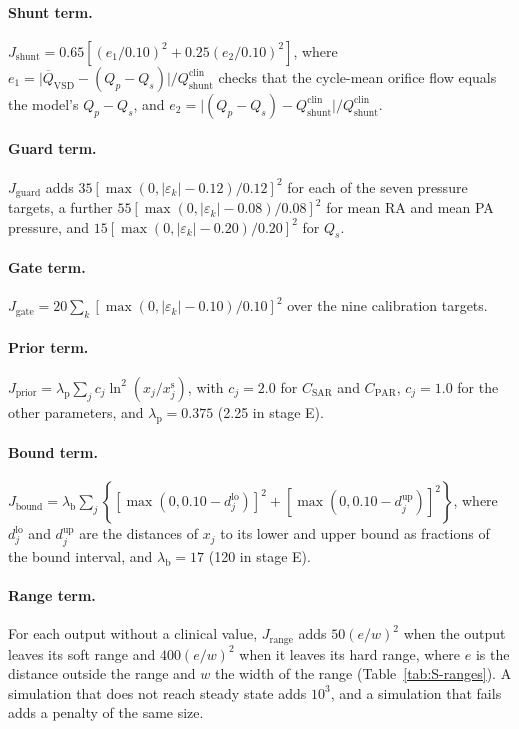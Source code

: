 \documentclass{article}
\begin{document}
\paragraph{Shunt term.} $J_{\mathrm{shunt}} = 0.65\left[(e_1/0.10)^2 + 0.25(e_2/0.10)^2\right]$, where $e_1 = \lvert \overline{Q}_{\mathrm{VSD}} - (Q_p - Q_s)\rvert / Q_{\mathrm{shunt}}^{\mathrm{clin}}$ checks that the cycle-mean orifice flow equals the model's $Q_p - Q_s$, and $e_2 = \lvert (Q_p - Q_s) - Q_{\mathrm{shunt}}^{\mathrm{clin}}\rvert / Q_{\mathrm{shunt}}^{\mathrm{clin}}$.

\paragraph{Guard term.} $J_{\mathrm{guard}}$ adds $35[\max(0, \lvert\varepsilon_k\rvert - 0.12)/0.12]^2$ for each of the seven pressure targets, a further $55[\max(0, \lvert\varepsilon_k\rvert - 0.08)/0.08]^2$ for mean RA and mean PA pressure, and $15[\max(0, \lvert\varepsilon_k\rvert - 0.20)/0.20]^2$ for $Q_s$.

\paragraph{Gate term.} $J_{\mathrm{gate}} = 20\sum_{k}[\max(0, \lvert\varepsilon_k\rvert - 0.10)/0.10]^2$ over the nine calibration targets.

\paragraph{Prior term.} $J_{\mathrm{prior}} = \lambda_{\mathrm{p}}\sum_j c_j \ln^2(x_j/x_j^{\mathrm{s}})$, with $c_j = 2.0$ for $C_{\mathrm{SAR}}$ and $C_{\mathrm{PAR}}$, $c_j = 1.0$ for the other parameters, and $\lambda_{\mathrm{p}} = 0.375$ (2.25 in stage E).

\paragraph{Bound term.} $J_{\mathrm{bound}} = \lambda_{\mathrm{b}}\sum_j\left\{[\max(0, 0.10 - d_j^{\mathrm{lo}})]^2 + [\max(0, 0.10 - d_j^{\mathrm{up}})]^2\right\}$, where $d_j^{\mathrm{lo}}$ and $d_j^{\mathrm{up}}$ are the distances of $x_j$ to its lower and upper bound as fractions of the bound interval, and $\lambda_{\mathrm{b}} = 17$ (120 in stage E).

\paragraph{Range term.} For each output without a clinical value, $J_{\mathrm{range}}$ adds $50(e/w)^2$ when the output leaves its soft range and $400(e/w)^2$ when it leaves its hard range, where $e$ is the distance outside the range and $w$ the width of the range (Table~\ref{tab:S-ranges}). A simulation that does not reach steady state adds $10^3$, and a simulation that fails adds a penalty of the same size.
\end{document}
